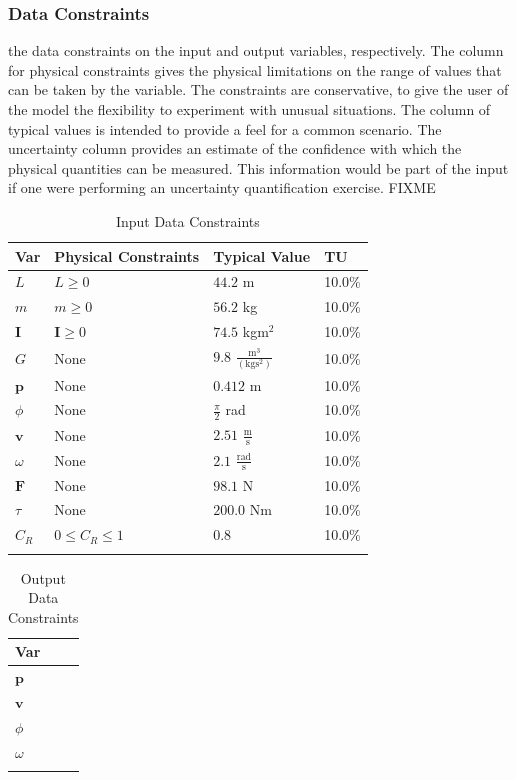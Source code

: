 \documentclass[12pt]{article}
\begin{document}
\subsubsection{Data Constraints}
\label{Sec:DataConstraints}
the data constraints on the input and output variables, respectively. The column for physical constraints gives the physical limitations on the range of values that can be taken by the variable. The constraints are conservative, to give the user of the model the flexibility to experiment with unusual situations. The column of typical values is intended to provide a feel for a common scenario. The uncertainty column provides an estimate of the confidence with which the physical quantities can be measured. This information would be part of the input if one were performing an uncertainty quantification exercise. FIXME
\begin{longtable}{l l l l}
\toprule
Var & Physical Constraints & Typical Value & TU
\\
\midrule
$L$ & $L\geq{}0$ & $44.2$ m & 10.0\%
\\
$m$ & $m\geq{}0$ & $56.2$ kg & 10.0\%
\\
$\mathbf{I}$ & $\mathbf{I}\geq{}0$ & $74.5$ kg$\text{m}^{2}$ & 10.0\%
\\
$G$ & None & $9.8$ $\frac{\text{m}^{3}}{(\text{kg}\text{s}^{2})}$ & 10.0\%
\\
$\mathbf{p}$ & None & $0.412$ m & 10.0\%
\\
$ϕ$ & None & $\frac{π}{2}$ rad & 10.0\%
\\
$\mathbf{v}$ & None & $2.51$ $\frac{\text{m}}{\text{s}}$ & 10.0\%
\\
$ω$ & None & $2.1$ $\frac{\text{rad}}{\text{s}}$ & 10.0\%
\\
$\mathbf{F}$ & None & $98.1$ N & 10.0\%
\\
$τ$ & None & $200.0$ Nm & 10.0\%
\\
${C_{R}}$ & $0\leq{}{C_{R}}\leq{}1$ & $0.8$ & 10.0\%
\\
\bottomrule
\caption{Input Data Constraints}
\label{Table:InDataConstraints}
\end{longtable}
\begin{longtable}{l}
\toprule
Var
\\
\midrule
$\mathbf{p}$
\\
$\mathbf{v}$
\\
$ϕ$
\\
$ω$
\\
\bottomrule
\caption{Output Data Constraints}
\label{Table:OutDataConstraints}
\end{longtable}
\end{document}
